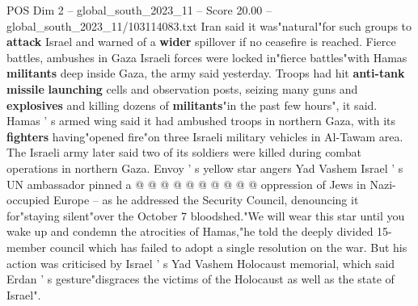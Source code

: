 \begin{textsample}{POS Dim 2 – global\_south\_2023\_11 – Score 20.00 – global\_south\_2023\_11/103114083.txt}
Iran said it was"natural"for such groups to \textbf{attack} Israel and warned of a \textbf{wider} spillover if no ceasefire is reached.
Fierce battles, ambushes in Gaza Israeli forces were locked in"fierce battles"with Hamas \textbf{militants} deep inside Gaza, the army said yesterday.
Troops had hit \textbf{anti-tank} \textbf{missile} \textbf{launching} cells and observation posts, seizing many guns and \textbf{explosives} and killing dozens of \textbf{militants}"in the past few hours", it said.
Hamas ' s armed wing said it had ambushed troops in northern Gaza, with its \textbf{fighters} having"opened fire"on three Israeli military vehicles in Al-Tawam area.
The Israeli army later said two of its soldiers were killed during combat operations in northern Gaza.
Envoy ' s yellow star angers Yad Vashem Israel ' s UN ambassador pinned a @ @ @ @ @ @ @ @ @ @ oppression of Jews in Nazi-occupied Europe -- as he addressed the Security Council, denouncing it for"staying silent"over the October 7 bloodshed."We will wear this star until you wake up and condemn the atrocities of Hamas,"he told the deeply divided 15-member council which has failed to adopt a single resolution on the war.
But his action was criticised by Israel ' s Yad Vashem Holocaust memorial, which said Erdan ' s gesture"disgraces the victims of the Holocaust as well as the state of Israel".

\end{textsample}
